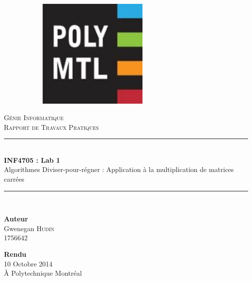 \documentclass[10pt,a4paper]{article}
\newcommand{\HRule}{\rule{\linewidth}{0.5mm}}
\begin{document}
\begin{titlepage}
	\begin{center}
		\begin{figure}
        \begin{subfigure}[c]{0.2\textwidth}
        		\centering
                \includegraphics[width=0.6\textwidth]{images/logo-polymtl}
        \end{subfigure}
		\end{figure}
		
		
		\vspace{30pt}
		\textsc{\huge Génie Informatique}\\
		\textsc{\LARGE Rapport de Travaux Pratiques}\\		
		\vfill
		
		\HRule \\[0.7cm]
		{\Huge \bfseries INF4705 : Lab 1}\\[0.4cm]
		{\Large Algorithmes Diviser-pour-régner : Application à la multiplication de matrices carrées}\\[0.2cm]
		\HRule\\[1cm]
		
		\vfill
		
		\begin{minipage}{0.49\textwidth}
			\begin{flushleft} \LARGE
				\textbf{Auteur}\\
				Gwenegan \textsc{Hudin}\\ 1756642\\[0.5cm]
			\end{flushleft}
		\end{minipage}
		\begin{minipage}{0.49\textwidth}
			\begin{flushright} \LARGE
				\textbf{Rendu}\\
				10 Octobre 2014\\ À Polytechnique Montréal\\[0.5cm]
			\end{flushright}
		\end{minipage}
	\end{center}
\end{titlepage}
\end{document}

